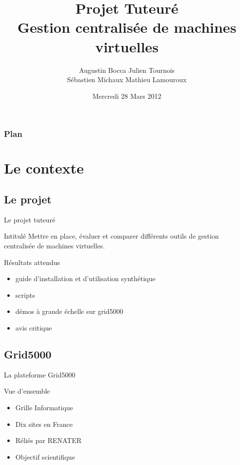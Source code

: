 \documentclass{beamer}
\title{Projet Tuteuré \\Gestion centralisée de machines virtuelles}
\author{Augustin Bocca Julien Tournois\\Sébastien Michaux Mathieu Lamouroux}
\institute{IUT de Nancy Charlemagne\\Licence Professionnelle ASRALL}
\date{Mercredi 28 Mars 2012}
\begin{document}

\begin{frame}
  \titlepage
\end{frame}

\begin{frame}
    \frametitle{Plan}
    \tableofcontents
\end{frame}

\section{Le contexte}
\subsection{Le projet}
\begin{frame}{Le projet tuteuré}
\begin{block}{Intitulé}
Mettre en place, évaluer et comparer différents outils de gestion centralisée de machines virtuelles.
\end{block}
\pause
\begin{block}{Résultats attendus}
  \begin{itemize}
    \item guide d'installation et d'utilisation synthétique
\pause
    \item scripts
\pause
    \item démos à grande échelle sur grid5000
\pause
    \item avis critique
   \end{itemize}
\end{block}
\end{frame}

\subsection{Grid5000}
\begin{frame}{La plateforme Grid5000}
\begin{block}{Vue d'ensemble}
  \begin{itemize}
    \item Grille Informatique
\pause
    \item Dix sites en France
\pause
    \item Réliés par RENATER
\pause
    \item Objectif scientifique
  \end{itemize}
\end{block}
\end{frame}
\end{document}
